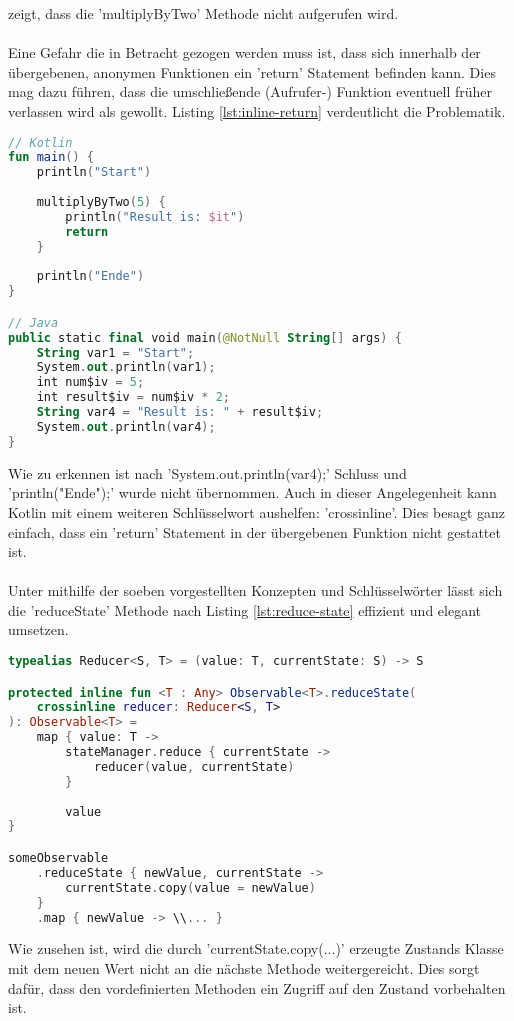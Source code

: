zeigt, dass die 'multiplyByTwo' Methode nicht aufgerufen wird.
\\\\
Eine Gefahr die in Betracht gezogen werden muss ist, dass sich innerhalb der übergebenen, anonymen Funktionen ein 'return' Statement befinden kann. Dies mag dazu führen, dass die umschließende (Aufrufer-) Funktion eventuell früher verlassen wird als gewollt. Listing
\ref{lst:inline-return}
verdeutlicht die Problematik.
\begin{lstlisting}[caption={inline mit 'return'}, label={lst:inline-compiled},language=Kotlin]
// Kotlin
fun main() {
	println("Start")
	
	multiplyByTwo(5) {
		println("Result is: $it")
		return
	}
	
	println("Ende")
}

// Java
public static final void main(@NotNull String[] args) {
	String var1 = "Start";
	System.out.println(var1);
	int num$iv = 5;
	int result$iv = num$iv * 2;
	String var4 = "Result is: " + result$iv;
	System.out.println(var4);
}
\end{lstlisting}
\bigskip
Wie zu erkennen ist nach 'System.out.println(var4);' Schluss und 'println("Ende");' wurde nicht übernommen. Auch in dieser Angelegenheit kann Kotlin mit einem weiteren Schlüsselwort aushelfen: 'crossinline'. Dies besagt ganz einfach, dass ein 'return' Statement in der übergebenen Funktion nicht gestattet ist.
\\\\
Unter mithilfe der soeben vorgestellten Konzepten und Schlüsselwörter lässt sich die 'reduceState' Methode nach Listing
\ref{lst:reduce-state}
effizient und elegant umsetzen.
\begin{lstlisting}[caption={'reduceState' Methode}, label={lst:reduce-state},language=Kotlin]
typealias Reducer<S, T> = (value: T, currentState: S) -> S

protected inline fun <T : Any> Observable<T>.reduceState(
	crossinline reducer: Reducer<S, T>
): Observable<T> =
	map { value: T ->
		stateManager.reduce { currentState ->
			reducer(value, currentState)
		}
	
		value
}

someObservable
	.reduceState { newValue, currentState ->
		currentState.copy(value = newValue)
	}
	.map { newValue -> \\... }
\end{lstlisting}
\bigskip
Wie zusehen ist, wird die durch 'currentState.copy(...)' erzeugte Zustands Klasse mit dem neuen Wert nicht an die nächste Methode weitergereicht. Dies sorgt dafür, dass den vordefinierten Methoden ein Zugriff auf den Zustand vorbehalten ist.
